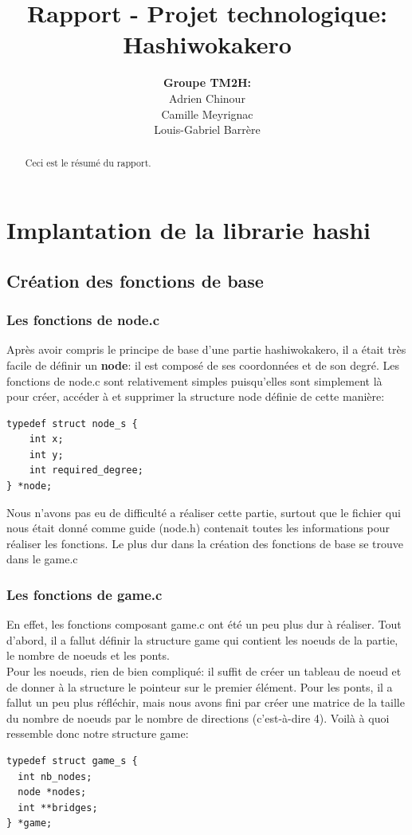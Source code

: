 \documentclass[12pt]{report}
\title{\textbf{Rapport - Projet technologique:\\Hashiwokakero}}
\author{\textbf{Groupe TM2H:}\\Adrien Chinour\\ Camille Meyrignac\\ Louis-Gabriel Barrère}
\begin{document}
\maketitle

\begin{abstract}
Ceci est le résumé du rapport.
\end{abstract}

\tableofcontents

\chapter{Implantation de la librarie hashi}

\section{Création des fonctions de base}

\subsection{Les fonctions de node.c}
\textnormal{Après avoir compris le principe de base d'une partie hashiwokakero, il a était très facile de définir un \textbf{node}: il est composé de ses coordonnées et de son degré. Les fonctions de node.c sont relativement simples puisqu'elles sont simplement là pour créer, accéder à et supprimer la structure node définie de cette manière:}
\begin{verbatim}
typedef struct node_s {
	int x;
	int y;
	int required_degree;
} *node;
\end{verbatim}

\textnormal{Nous n'avons pas eu de difficulté a réaliser cette partie, surtout que le fichier qui nous était donné comme guide (node.h) contenait toutes les informations pour réaliser les fonctions. Le plus dur dans la création des fonctions de base se trouve dans le game.c}
\subsection{Les fonctions de game.c}
\textnormal{En effet, les fonctions composant game.c ont été un peu plus dur à réaliser. Tout d'abord, il a fallut définir la structure game qui contient les noeuds de la partie, le nombre de noeuds et les ponts.\\ Pour les noeuds, rien de bien compliqué: il suffit de créer un tableau de noeud et de donner à la structure le pointeur sur le premier élément. Pour les ponts, il a fallut un peu plus réfléchir, mais nous avons fini par créer une matrice de la taille du nombre de noeuds par le nombre de directions (c'est-à-dire 4). Voilà à quoi ressemble donc notre structure game:}
\begin{verbatim}
typedef struct game_s {
  int nb_nodes;
  node *nodes; 
  int **bridges;
} *game;
\end{verbatim}
\end{document}
